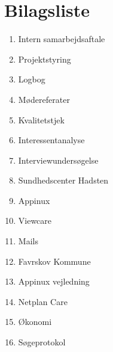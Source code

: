 \chapter{Bilagsliste}

\begin{enumerate}
 	\item Intern samarbejdsaftale
  	\item Projektstyring
  	\item Logbog
  	\item Mødereferater
  	\item Kvalitetstjek
  	\item Interessentanalyse 
  	\item Interviewundersøgelse
  	\item Sundhedscenter Hadsten
  	\item Appinux
  	\item Viewcare
  	\item Mails
  	\item Favrskov Kommune
  	\item Appinux vejledning
  	\item Netplan Care
  	\item Økonomi
  	\item Søgeprotokol
\end{enumerate}



